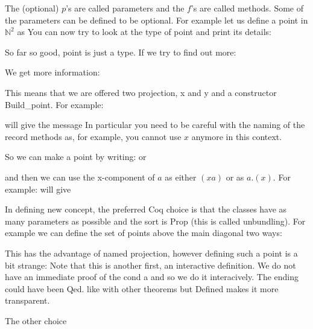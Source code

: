 The (optional) $p$'s are called parameters and the $f$'s are called methods. Some of the parameters can be defined to be optional. For example let us define a point in $\mathbb{N}^2$ as
 You can now try to look at the type of point and print its details:


    So far so good, point is just a type. If we try to find out more:
   
    
We get more information:


This means that we are offered two projection, x and y and a constructor Build\_point. For example:

will give the message
In particular you need to be careful with the naming of the record methods as, for example, you cannot use $x$ anymore in this context.

So we can make a point by writing:
or 

and then we can use the x-component of $a$ as either $(x a)$ or as $a.(x)$.
For example:
will give 
     
In defining new concept, the preferred Coq choice is that the classes have as many parameters as possible and the sort is Prop (this is called unbundling). For example we can define the set of points above the main diagonal  two ways:


This has the advantage of named projection, however defining such a point is a bit strange:
Note that this is another first, an interactive definition. We do not have an immediate proof of the cond a and so we do it interacively. The ending could have been Qed. like with other theorems but Defined makes it more transparent.


The other choice  


